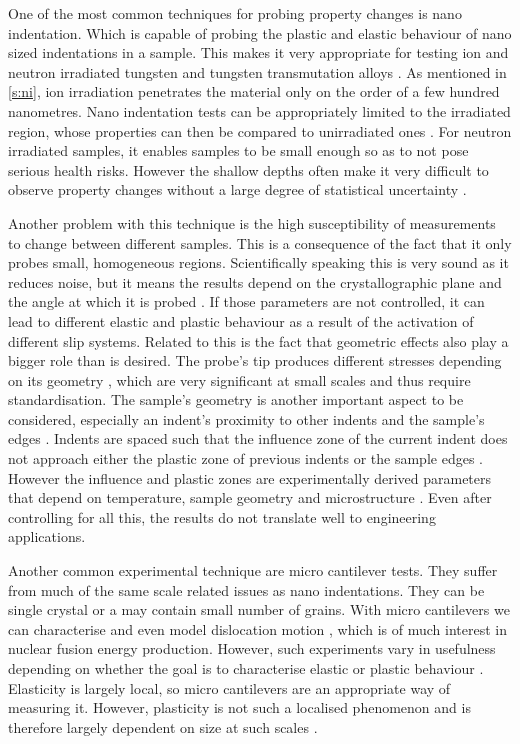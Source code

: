 \documentclass[12pt, a4paper]{article}
\begin{document}
		One of the most common techniques for probing property changes is nano indentation. Which is capable of probing the plastic and elastic behaviour of nano sized indentations in a sample. This makes it very appropriate for testing ion and neutron irradiated tungsten and tungsten transmutation alloys \cite{ionirrmic, ionirrprop, ionirrprop2, hardening}. As mentioned in \cref{s:ni}, ion irradiation penetrates the material only on the order of a few hundred nanometres. Nano indentation tests can be appropriately limited to the irradiated region, whose properties can then be compared to unirradiated ones \cite{ionirrprop, ionirrprop2, hardening}. For neutron irradiated samples, it enables samples to be small enough so as to not pose serious health risks. However the shallow depths often make it very difficult to observe property changes without a large degree of statistical uncertainty \cite{ionirrprop, ionirrprop2, hardening}.
		
		Another problem with this technique is the high susceptibility of measurements to change between different samples. This is a consequence of the fact that it only probes small, homogeneous regions. Scientifically speaking this is very sound as it reduces noise, but it means the results depend on the crystallographic plane and the angle at which it is probed \cite{ionirrmic,nanointorient}. If those parameters are not controlled, it can lead to different elastic and plastic behaviour as a result of the activation of different slip systems. Related to this is the fact that geometric effects also play a bigger role than is desired. The probe's tip produces different stresses depending on its geometry \cite{tipgeom}, which are very significant at small scales and thus require standardisation. The sample's geometry is another important aspect to be considered, especially an indent's proximity to other indents and the sample's edges \cite{nanoindent2}. Indents are spaced such that the influence zone of the current indent does not approach either the plastic zone of previous indents or the sample edges \cite{nanoindent1}. However the influence and plastic zones are experimentally derived parameters that depend on temperature, sample geometry and microstructure \cite{plasticzone}. Even after controlling for all this, the results do not translate well to engineering applications.
		
		Another common experimental technique are micro cantilever tests. They suffer from much of the same scale related issues as nano indentations. They can be single crystal or a may contain small number of grains. With micro cantilevers we can characterise and even model dislocation motion \cite{dismot}, which is of much interest in nuclear fusion energy production. However, such experiments vary in usefulness depending on whether the goal is to characterise elastic or plastic behaviour \cite{microcant}. Elasticity is largely local, so micro cantilevers are an appropriate way of measuring it. However, plasticity is not such a localised phenomenon and is therefore largely dependent on size at such scales \cite{sizeeff}.
				
\end{document}
